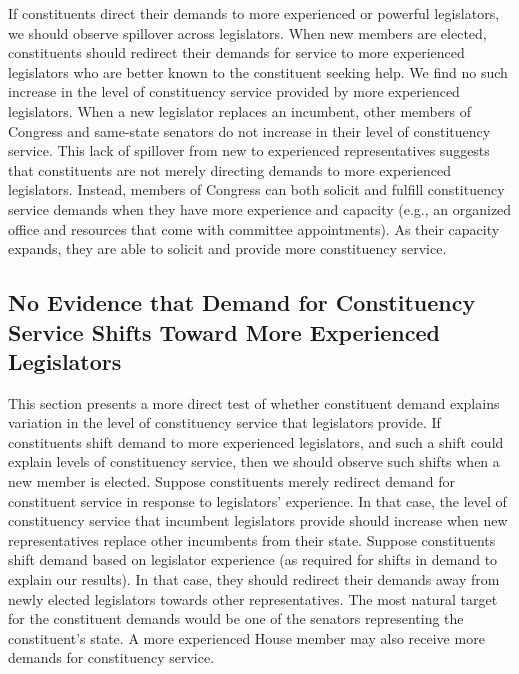 \documentclass[12pt]{article}
\begin{document}
If constituents direct their demands to more experienced or powerful legislators, we should observe spillover across legislators. When new members are elected, constituents should redirect their demands for service to more experienced legislators who are better known to the constituent seeking help. We find no such increase in the level of constituency service provided by more experienced legislators. When a new legislator replaces an incumbent, other members of Congress and same-state senators do not increase in their level of constituency service. This lack of spillover from new to experienced representatives suggests that constituents are not merely directing demands to more experienced legislators. Instead, members of Congress can both solicit and fulfill constituency service demands when they have more experience and capacity (e.g., an organized office and resources that come with committee appointments). As their capacity expands, they are able to solicit and provide more constituency service.  %


\subsection{No Evidence that Demand for Constituency Service Shifts Toward More Experienced Legislators}
This section presents a more direct test of whether constituent demand explains variation in the level of constituency service that legislators provide. If constituents shift demand to more experienced legislators, and such a shift could explain levels of constituency service, then we should observe such shifts when a new member is elected. Suppose constituents merely redirect demand for constituent service in response to legislators' experience. In that case, the level of constituency service that incumbent legislators provide should increase when new representatives replace other incumbents from their state. Suppose constituents shift demand based on legislator experience (as required for shifts in demand to explain our results). In that case, they should redirect their demands away from newly elected legislators towards other representatives. The most natural target for the constituent demands would be one of the senators representing the constituent's state. A more experienced House member may also receive more demands for constituency service.
\end{document}
